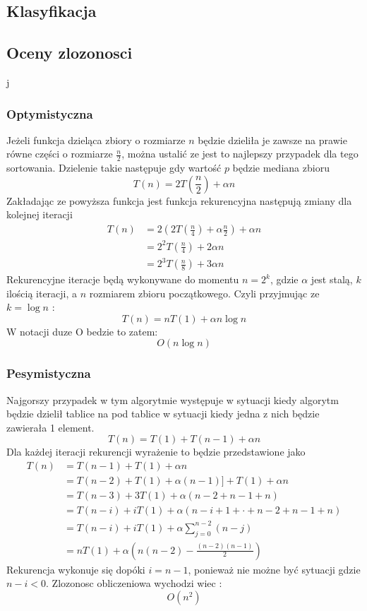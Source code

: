 \subsection{Klasyfikacja}

\subsection{Oceny zlozonosci}
j
\subsubsection{Optymistyczna}
Jeżeli funkcja dzieląca zbiory o rozmiarze $n$ będzie dzieliła je zawsze na prawie równe części o rozmiarze $\frac{n}{2}$, można ustalić ze jest to najlepszy przypadek dla tego sortowania. Dzielenie takie następuje gdy wartość $p$ będzie mediana zbioru \cite{quicksort}
\begin{equation*}
T(n) = 2T(\frac{n}{2}) +\alpha n
\end{equation*}
Zakładając ze powyższa funkcja jest funkcja rekurencyjna następują zmiany dla kolejnej iteracji
\begin{align*}
 T(n) &= 2(2T(\frac{n}{4}) + \alpha \frac{n}{2}) + \alpha n \\
      &= 2^{2}T( \frac{n}{4}) + 2 \alpha n \\
      &= 2^{3}T( \frac{n}{8}) + 3 \alpha n
 \end{align*}
Rekurencyjne iteracje będą wykonywane do momentu $n = 2^{k}$, gdzie $\alpha$ jest  stalą, $k$ ilością iteracji, a $n$ rozmiarem zbioru początkowego. Czyli przyjmując ze $k = \log n$ :
\begin{equation*}
T(n) =nT(1) +\alpha n \log n
\end{equation*}
W notacji duze O bedzie to zatem:
\begin{equation*}
O(n \log n)
\end{equation*}
\subsubsection{Pesymistyczna}
Najgorszy przypadek w tym algorytmie występuje w sytuacji kiedy algorytm będzie dzielił tablice na pod tablice w sytuacji kiedy jedna z nich będzie zawierała 1 element.
\begin{equation*}
T(n) =T(1) +T(n−1) + \alpha n
\end{equation*}
Dla każdej iteracji rekurencji wyrażenie to będzie przedstawione jako 
\begin{align*}
T(n) &=T(n−1) +T(1) + \alpha n \\
	 &= T(n−2) +T(1) +\alpha(n−1)] +T(1) + \alpha n \\
	 &= T(n−3) + 3T(1) +\alpha(n−2 +n−1 +n) \\
	 &= T(n−i) +iT(1) +\alpha(n−i+ 1 + \cdot + n−2 +n−1 +n) \\
	 &= T(n−i) +iT(1) +\alpha \sum_{j=0}^{n-2}(n-j) \\ 
	 &= nT(1) +\alpha(n(n−2)−\frac{(n−2)(n−1)}{2})
 \end{align*}
Rekurencja wykonuje się dopóki $i=n-1$, ponieważ nie możne być sytuacji gdzie $n-i <0$.
Zlozonosc obliczeniowa wychodzi wiec :
\begin{equation*}
O(n^2)
\end{equation*}
